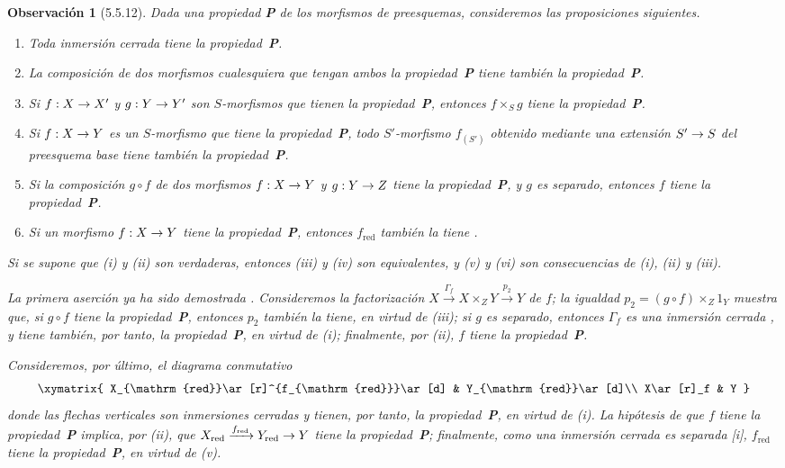 \documentclass[oneside]{amsart}
\theoremstyle{ega-env-style}
\theoremstyle{ega-thm-env-style}
\theoremstyle{ega-defn-env-style}
\newtheorem*{remark}{Observación}
\renewcommand{\to}{\mathchoice{\longrightarrow}{\rightarrow}{\rightarrow}{\rightarrow}}
\newcommand{\oldpage}[2][]{{\marginnote{\normalfont{\textbf{#1}~|~#2}}}\ignorespaces}
\let\EGAOriginalLabel\label
\renewcommand{\label}[1]{\phantomsection\EGAOriginalLabel{#1}}
\begin{document}
\begin{remark}[5.5.12]
\label{I.5.5.12}
Dada una propiedad \textbf{\textit P} de los morfismos de preesquemas, consideremos las proposiciones siguientes.
\begin{enumerate}
  \item[(i)] \emph{Toda inmersión cerrada tiene la propiedad~\textbf{\textup{P}}.}
  \item[(ii)] \emph{La composición de dos morfismos cualesquiera que tengan ambos la propiedad~\textbf{\textup{P}} tiene también la propiedad~\textbf{\textup{P}}.}
  \item[(iii)] \emph{Si $f:X\to X'$ y $g:Y\to Y'$ son $S$-morfismos que tienen la propiedad~\textbf{\textup{P}}, entonces $f\times_S g$ tiene la propiedad~\textbf{\textup{P}}.}
\oldpage[I]{140}
  \item[(iv)] \emph{Si $f:X\to Y$ es un $S$-morfismo que tiene la propiedad~\textbf{P}, todo $S'$-morfismo $f_{(S')}$ obtenido mediante una extensión $S'\to S$ del preesquema base tiene también la propiedad~\textbf{P}.}
  \item[(v)] \emph{Si la composición $g\circ f$ de dos morfismos $f:X\to Y$ y $g:Y\to Z$ tiene la propiedad~\textbf{P}, y $g$ es separado, entonces $f$ tiene la propiedad~\textbf{P}.}
  \item[(vi)] \emph{Si un morfismo $f:X\to Y$ tiene la propiedad~\textbf{P}, entonces $f_{\mathrm{red}}$ también la tiene .}
\end{enumerate}
Si se supone que (i) y (ii) son verdaderas, entonces (iii) y (iv) son \emph{equivalentes}, y (v) y (vi) son \emph{consecuencias} de (i), (ii) y (iii).

La primera aserción ya ha sido demostrada .
Consideremos la factorización  $X\xrightarrow{\Gamma_f}X\times_Z Y\xrightarrow{p_2}Y$ de $f$;
la igualdad $p_2=(g\circ f)\times_Z 1_Y$ muestra que, si $g\circ f$ tiene la propiedad~\textbf{\textit{P}}, entonces $p_2$ también la tiene, en virtud de (iii);
si $g$ es separado, entonces $\Gamma_f$ es una inmersión cerrada , y tiene también, por tanto, la propiedad~\textbf{\textit{P}}, en virtud de (i);
finalmente, por (ii), $f$ tiene la propiedad~\textbf{\textit{P}}.

Consideremos, por último, el diagrama conmutativo
\[
  \xymatrix{
    X_{\mathrm{red}}\ar[r]^{f_{\mathrm{red}}}\ar[d] &
    Y_{\mathrm{red}}\ar[d]\\
    X\ar[r]_f &
    Y
  }
\]
donde las flechas verticales son inmersiones cerradas  y tienen, por tanto, la propiedad~\textbf{\textit{P}}, en virtud de (i).
La hipótesis de que $f$ tiene la propiedad~\textbf{\textit{P}} implica, por (ii), que $X_{\mathrm{red}}\xrightarrow{f_{\mathrm{red}}}Y_{\mathrm{red}}\to Y$ tiene la propiedad~\textbf{\textit{P}};
finalmente, como una inmersión cerrada es separada [i], $f_{\mathrm{red}}$ tiene la propiedad~\textbf{\textit{P}}, en virtud de (v).


\end{remark}
\end{document}
